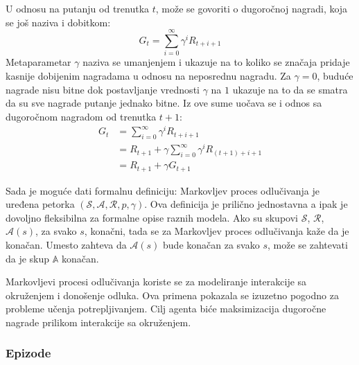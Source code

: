 U odnosu na putanju od trenutka $t$, može se govoriti o dugoročnoj nagradi, koja se još naziva i dobitkom:
\begin{equation}
\label{eq:dug_suma}
	G_t = \sum_{i=0}^{\infty} \gamma^iR_{t+i+1}
\end{equation}
Metaparametar $\gamma$ naziva se umanjenjem i ukazuje na to koliko se značaja pridaje kasnije dobijenim nagradama u odnosu na neposrednu nagradu. Za $\gamma = 0$, buduće nagrade nisu bitne dok postavljanje vrednosti $\gamma$ na $1$ ukazuje na to da se smatra da su sve nagrade putanje jednako bitne. Iz ove sume uočava se i odnos sa dugoročnom nagradom od trenutka $t+1$:
\begin{equation}
	\begin{aligned}
		G_t &= \sum_{i=0}^{\infty} \gamma^iR_{t+i+1} \\
        	&= R_{t+1} + \gamma\sum_{i=0}^{\infty} \gamma^iR_{(t+1)+i+1} \\
        	&=R_{t+1} + \gamma G_{t+1}
	\end{aligned}
\end{equation}
\par 
Sada je moguće dati formalnu definiciju: Markovljev proces odlučivanja je uređena petorka $(\mathcal{S}, \mathcal{A}, \mathcal{R}, p, \gamma)$. Ova definicija je prilično jednostavna a ipak je dovoljno fleksibilna za formalne opise raznih modela. Ako su skupovi $\mathcal{S}$, $\mathcal{R}$, $\mathcal{A}(s)$, za svako $s$, konačni, tada se za Markovljev proces odlučivanja kaže da je konačan. Umesto zahteva da $\mathcal{A}(s)$ bude konačan za svako $s$, može se zahtevati da je skup $\mathbb{A}$ konačan.
\par 
Markovljevi procesi odlučivanja koriste se za modeliranje interakcije sa okruženjem i donošenje odluka. Ova primena pokazala se izuzetno pogodno za probleme učenja potrepljivanjem. Cilj agenta biće maksimizacija dugoročne nagrade prilikom interakcije sa okruženjem.


\subsubsection{Epizode}

